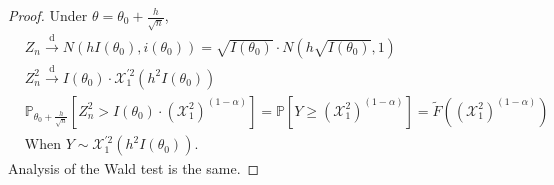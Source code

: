 \documentclass[a4paper]{article}
\begin{document}
\begin{proof}
	Under $\theta = \theta_0 + \frac{h}{\sqrt{n}}$,
	\begin{equation*}
		\begin{aligned}
			& Z_n \stackrel{\text{d}}{\longrightarrow} N(hI(\theta_0),i(\theta_0)) = \sqrt{I(\theta_0)} \cdot N(h\sqrt{I(\theta_0)},1) \\
			& Z_n^2 \stackrel{\text{d}}{\longrightarrow} I(\theta_0) \cdot \mathcal{X}_1^{'2} \left(h^2 I(\theta_0)\right) \\
			&\mathbb{P}_{\theta_0+\frac{h}{\sqrt{n}}} \left[Z_n^2 > I(\theta_0) \cdot \left(\mathcal{X}_1^2\right)^{(1-\alpha)}\right] = \mathbb{P}\left[Y \geq \left(\mathcal{X}_1^2\right)^{(1-\alpha)} \right] = \tilde{F} \left(\left(\mathcal{X}_1^2\right)^{(1-\alpha)}\right) \\
			& \text{When } Y \sim \mathcal{X}_1^{'2} \left(h^2 I(\theta_0)\right).
		\end{aligned}
	\end{equation*}
	Analysis of the Wald test is the same.
\end{proof}
\end{document}
